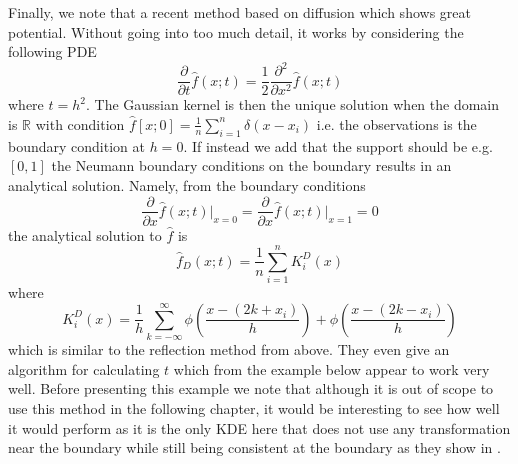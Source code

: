 \documentclass[../Thesis.tex]{subfiles}
\begin{document}
Finally, we note that a recent method based on diffusion \cite{A-Novel-Nonparametric-Density-Estimator} \cite{Kernel-density-estimation-via-diffusion} which shows great potential. Without going into too much detail, it works by considering the following PDE
$$\frac{\partial}{\partial t} \hat{f}\left(x;t\right) = \frac{1}{2} \frac{\partial^2}{\partial x^2} \hat{f}\left(x;t\right)$$
where $t = h^2$. The Gaussian kernel is then the unique solution when the domain is $\mathbb{R}$ with condition $\hat{f}\left[x;0\right] = \frac{1}{n} \sum_{i=1}^{n} \delta \left(x-x_i\right)$ i.e. the observations is the boundary condition at $h=0$. If instead we add that the support should be e.g. $[0,1]$ the Neumann boundary conditions on the boundary results in an analytical solution. Namely, from the boundary conditions
$$\frac{\partial}{\partial x} \hat{f}\left(x;t\right) \bigg\rvert_{x = 0} = \frac{\partial}{\partial x} \hat{f}\left(x;t\right) \bigg\rvert_{x = 1} = 0$$
the analytical solution to $\hat{f}$ is
$$\hat{f}_D\left(x ; t\right) = \frac{1}{n} \sum_{i=1}^{n} K_i^D \left(x\right)$$
where
$$K_i^D \left(x\right) = \frac{1}{h}\sum_{k=-\infty}^{\infty} \phi\left(\frac{x - \left(2k+x_i\right)}{h}\right) + \phi\left(\frac{x - \left(2k-x_i\right)}{h}\right)$$
which is similar to the reflection method from above. They even give an algorithm for calculating $t$ which from the example below appear to work very well. Before presenting this example we note that although it is out of scope to use this method in the following chapter, it would be interesting to see how well it would perform as it is the only KDE here that does not use any transformation near the boundary while still being consistent at the boundary as they show in \cite{Kernel-density-estimation-via-diffusion}.
\end{document}
